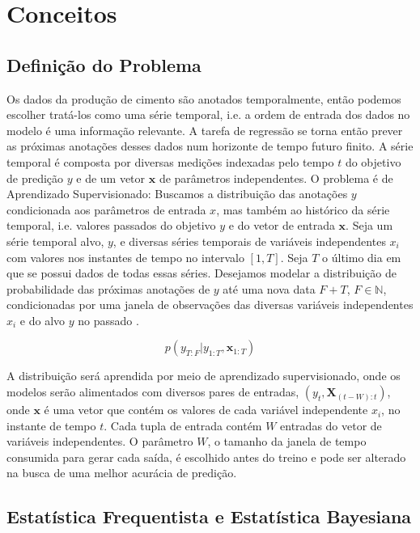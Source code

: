 \chapter{Conceitos}
\label{cap:conceitos}


\section{Definição do Problema}


Os dados da produção de cimento são anotados temporalmente, então podemos escolher
tratá-los como uma série temporal, i.e. a ordem de entrada dos dados no modelo
é uma informação relevante. A tarefa de regressão se torna então prever as próximas anotações desses
dados num horizonte de tempo futuro finito. A série temporal é composta por diversas medições indexadas pelo tempo $t$ do objetivo
de predição $y$ e de um vetor $\textbf{x}$ de parâmetros independentes. O problema é de Aprendizado
Supervisionado: Buscamos a distribuição das anotações $y$ condicionada
aos parâmetros de entrada $x$, mas também ao
histórico da série temporal, i.e. valores passados do objetivo $y$ e do
vetor de entrada $\textbf{x}$. 
Seja um série temporal alvo, $y$, e diversas séries temporais de variáveis
independentes $x_i$ com valores nos instantes de tempo no intervalo $[1,T]$. Seja $T$ o último dia em que se possui dados de todas essas
séries. Desejamos modelar a distribuição de probabilidade das próximas anotações
de $y$ até uma nova data $F + T$, $F \in \mathbb{N}$, condicionadas por uma janela de
observações das diversas variáveis independentes $x_i$ e do alvo $y$ no passado \citep{deepfactors}.

\[ p(y_{T:F} | y_{1:T},\textbf{x}_{{1}:T}) \]

A distribuição será aprendida por meio de aprendizado supervisionado, onde os
modelos serão alimentados com diversos pares de entradas,
$(y_t,\textbf{X}_{(t-W):t})$, onde $\textbf{x}$ é uma vetor que contém os valores de
cada variável independente $x_i$, no instante de tempo $t$. Cada tupla de
entrada contém $W$ entradas do vetor de variáveis independentes. O parâmetro $W$, o
tamanho da janela de tempo consumida para gerar cada saída, é escolhido antes do
treino e pode ser alterado na busca de uma melhor acurácia de predição.

\section{Estatística Frequentista e Estatística Bayesiana}
 
